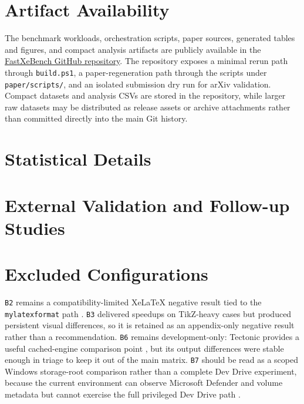 \documentclass[11pt]{article}
\begin{document}
\section{Artifact Availability}
The benchmark workloads, orchestration scripts, paper sources, generated tables and figures, and compact analysis artifacts are publicly available in the \href{https://github.com/handsomeZR-netizen/fastxebench}{FastXeBench GitHub repository}. The repository exposes a minimal rerun path through \texttt{build.ps1}, a paper-regeneration path through the scripts under \texttt{paper/scripts/}, and an isolated submission dry run for arXiv validation. Compact datasets and analysis CSVs are stored in the repository, while larger raw datasets may be distributed as release assets or archive attachments rather than committed directly into the main Git history.

\appendix
\section{Statistical Details}


\section{External Validation and Follow-up Studies}





\section{Excluded Configurations}
\texttt{B2} remains a compatibility-limited XeLaTeX negative result tied to the \texttt{mylatexformat} path \cite{ctan-mylatexformat}. \texttt{B3} delivered speedups on TikZ-heavy cases but produced persistent visual differences, so it is retained as an appendix-only negative result rather than a recommendation. \texttt{B6} remains development-only: Tectonic provides a useful cached-engine comparison point \cite{tectonic-build}, but its output differences were stable enough in triage to keep it out of the main matrix. \texttt{B7} should be read as a scoped Windows storage-root comparison rather than a complete Dev Drive experiment, because the current environment can observe Microsoft Defender and volume metadata but cannot exercise the full privileged Dev Drive path \cite{ms-devdrive}.



\end{document}
